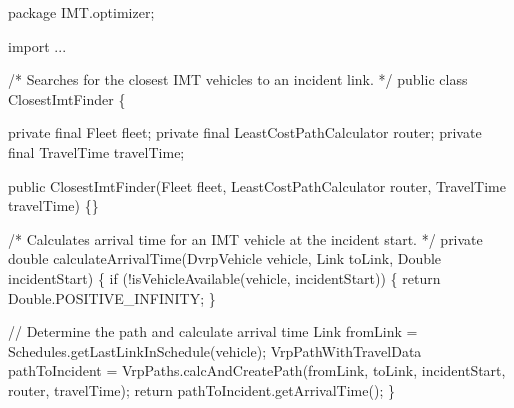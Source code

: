 \documentclass[fancy, oneside, mastersfancy, ms]{byuthesis}
\newenvironment{Shaded}{\begin{snugshade}}{\end{snugshade}}
\newcommand{\BuiltInTok}[1]{\textcolor[rgb]{0.00,0.23,0.31}{#1}}
\newcommand{\CommentTok}[1]{\textcolor[rgb]{0.37,0.37,0.37}{#1}}
\newcommand{\ControlFlowTok}[1]{\textcolor[rgb]{0.00,0.23,0.31}{#1}}
\newcommand{\DataTypeTok}[1]{\textcolor[rgb]{0.68,0.00,0.00}{#1}}
\newcommand{\FunctionTok}[1]{\textcolor[rgb]{0.28,0.35,0.67}{#1}}
\newcommand{\ImportTok}[1]{\textcolor[rgb]{0.00,0.46,0.62}{#1}}
\newcommand{\KeywordTok}[1]{\textcolor[rgb]{0.00,0.23,0.31}{#1}}
\newcommand{\NormalTok}[1]{\textcolor[rgb]{0.00,0.23,0.31}{#1}}
\newcommand{\OperatorTok}[1]{\textcolor[rgb]{0.37,0.37,0.37}{#1}}
\begin{document}
\begin{Shaded}
\begin{Highlighting}[]
\KeywordTok{package}\ImportTok{ IMT}\OperatorTok{.}\ImportTok{optimizer}\OperatorTok{;}

\KeywordTok{import} \OperatorTok{...}

\CommentTok{/* Searches for the closest IMT vehicles to an incident link. */}
\KeywordTok{public} \KeywordTok{class}\NormalTok{ ClosestImtFinder }\OperatorTok{\{}

    \KeywordTok{private} \DataTypeTok{final}\NormalTok{ Fleet fleet}\OperatorTok{;}
    \KeywordTok{private} \DataTypeTok{final}\NormalTok{ LeastCostPathCalculator router}\OperatorTok{;}
    \KeywordTok{private} \DataTypeTok{final}\NormalTok{ TravelTime travelTime}\OperatorTok{;}

    \KeywordTok{public} \FunctionTok{ClosestImtFinder}\OperatorTok{(}\NormalTok{Fleet fleet}\OperatorTok{,}\NormalTok{ LeastCostPathCalculator router}\OperatorTok{,} 
\NormalTok{                            TravelTime travelTime}\OperatorTok{)} \OperatorTok{\{\}}

\CommentTok{/* Calculates arrival time for an IMT vehicle at the incident start. */}
    \KeywordTok{private} \DataTypeTok{double} \FunctionTok{calculateArrivalTime}\OperatorTok{(}\NormalTok{DvrpVehicle vehicle}\OperatorTok{,} 
\NormalTok{                                        Link toLink}\OperatorTok{,} 
                                        \BuiltInTok{Double}\NormalTok{ incidentStart}\OperatorTok{)} \OperatorTok{\{}
        \ControlFlowTok{if} \OperatorTok{(!}\FunctionTok{isVehicleAvailable}\OperatorTok{(}\NormalTok{vehicle}\OperatorTok{,}\NormalTok{ incidentStart}\OperatorTok{))} \OperatorTok{\{}
            \ControlFlowTok{return} \BuiltInTok{Double}\OperatorTok{.}\FunctionTok{POSITIVE\_INFINITY}\OperatorTok{;}
        \OperatorTok{\}}

        \CommentTok{// Determine the path and calculate arrival time}
\NormalTok{        Link fromLink }\OperatorTok{=}\NormalTok{ Schedules}\OperatorTok{.}\FunctionTok{getLastLinkInSchedule}\OperatorTok{(}\NormalTok{vehicle}\OperatorTok{);}
\NormalTok{        VrpPathWithTravelData pathToIncident }\OperatorTok{=} 
\NormalTok{        VrpPaths}\OperatorTok{.}\FunctionTok{calcAndCreatePath}\OperatorTok{(}\NormalTok{fromLink}\OperatorTok{,}\NormalTok{ toLink}\OperatorTok{,}\NormalTok{ incidentStart}\OperatorTok{,} 
\NormalTok{                                   router}\OperatorTok{,}\NormalTok{ travelTime}\OperatorTok{);}
        \ControlFlowTok{return}\NormalTok{ pathToIncident}\OperatorTok{.}\FunctionTok{getArrivalTime}\OperatorTok{();}
    \OperatorTok{\}}


\end{Highlighting}
\end{Shaded}
\end{document}
